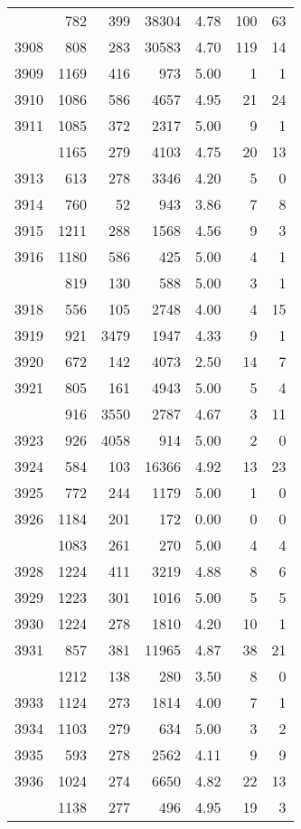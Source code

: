 \documentclass[
]{article}
\begin{document}
\begin{table}
\begin{tabular}[t]{lrrrrrr}
\addlinespace
3907 & 782 & 399 & 38304 & 4.78 & 100 & 63\\
3908 & 808 & 283 & 30583 & 4.70 & 119 & 14\\
3909 & 1169 & 416 & 973 & 5.00 & 1 & 1\\
3910 & 1086 & 586 & 4657 & 4.95 & 21 & 24\\
3911 & 1085 & 372 & 2317 & 5.00 & 9 & 1\\
\addlinespace
3912 & 1165 & 279 & 4103 & 4.75 & 20 & 13\\
3913 & 613 & 278 & 3346 & 4.20 & 5 & 0\\
3914 & 760 & 52 & 943 & 3.86 & 7 & 8\\
3915 & 1211 & 288 & 1568 & 4.56 & 9 & 3\\
3916 & 1180 & 586 & 425 & 5.00 & 4 & 1\\
\addlinespace
3917 & 819 & 130 & 588 & 5.00 & 3 & 1\\
3918 & 556 & 105 & 2748 & 4.00 & 4 & 15\\
3919 & 921 & 3479 & 1947 & 4.33 & 9 & 1\\
3920 & 672 & 142 & 4073 & 2.50 & 14 & 7\\
3921 & 805 & 161 & 4943 & 5.00 & 5 & 4\\
\addlinespace
3922 & 916 & 3550 & 2787 & 4.67 & 3 & 11\\
3923 & 926 & 4058 & 914 & 5.00 & 2 & 0\\
3924 & 584 & 103 & 16366 & 4.92 & 13 & 23\\
3925 & 772 & 244 & 1179 & 5.00 & 1 & 0\\
3926 & 1184 & 201 & 172 & 0.00 & 0 & 0\\
\addlinespace
3927 & 1083 & 261 & 270 & 5.00 & 4 & 4\\
3928 & 1224 & 411 & 3219 & 4.88 & 8 & 6\\
3929 & 1223 & 301 & 1016 & 5.00 & 5 & 5\\
3930 & 1224 & 278 & 1810 & 4.20 & 10 & 1\\
3931 & 857 & 381 & 11965 & 4.87 & 38 & 21\\
\addlinespace
3932 & 1212 & 138 & 280 & 3.50 & 8 & 0\\
3933 & 1124 & 273 & 1814 & 4.00 & 7 & 1\\
3934 & 1103 & 279 & 634 & 5.00 & 3 & 2\\
3935 & 593 & 278 & 2562 & 4.11 & 9 & 9\\
3936 & 1024 & 274 & 6650 & 4.82 & 22 & 13\\
\addlinespace
3937 & 1138 & 277 & 496 & 4.95 & 19 & 3\\

\end{tabular}
\end{table}
\end{document}

